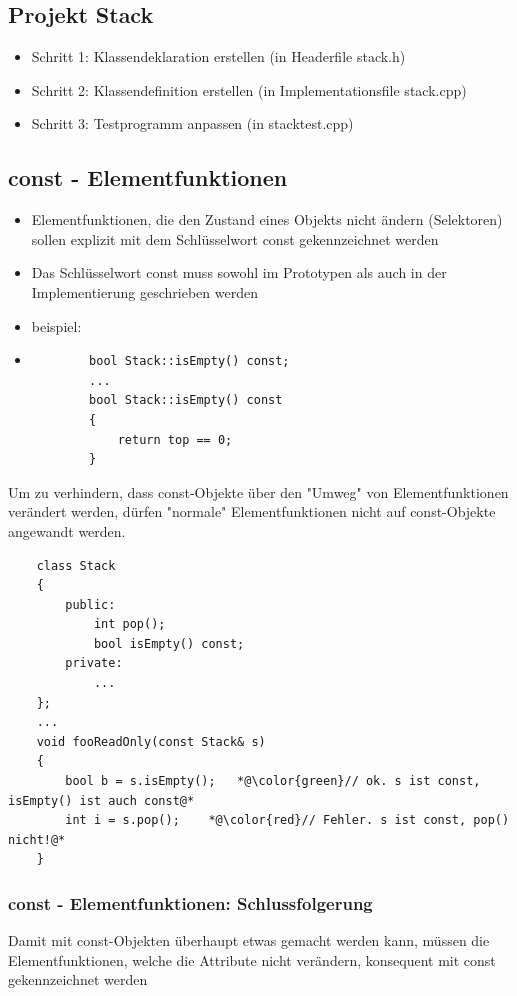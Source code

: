 \subsection{Projekt Stack}
\label{sec:Projekt Stack}
\begin{itemize}
	\item Schritt 1: Klassendeklaration erstellen (in Headerfile stack.h)
	\item Schritt 2: Klassendefinition erstellen (in Implementationsfile stack.cpp)
	\item Schritt 3: Testprogramm anpassen (in stacktest.cpp)
\end{itemize}

\subsection{const - Elementfunktionen}
\label{sec:const - Elementfunktionen}
\begin{itemize}
	\item Elementfunktionen, die den Zustand eines Objekts nicht ändern (Selektoren) sollen explizit mit dem Schlüsselwort const gekennzeichnet werden
	\item Das Schlüsselwort const muss sowohl im Prototypen als auch in der Implementierung geschrieben werden
	\item beispiel:
	\item[\-] \begin{minipage}{\linewidth}
		\begin{lstlisting}
		bool Stack::isEmpty() const;
		...
		bool Stack::isEmpty() const
		{
			return top == 0;
		}
		\end{lstlisting}
	\end{minipage}
\end{itemize}
Um zu verhindern, dass const-Objekte über den "Umweg" von Elementfunktionen verändert werden, dürfen "normale" Elementfunktionen nicht auf const-Objekte angewandt werden.
\noindent
\begin{minipage}{\linewidth}
	\begin{lstlisting}
	class Stack
	{
		public:
			int pop();
			bool isEmpty() const;
		private:
			...
	};
	...
	void fooReadOnly(const Stack& s)
	{
		bool b = s.isEmpty();	*@\color{green}// ok. s ist const, isEmpty() ist auch const@*
		int i = s.pop();	*@\color{red}// Fehler. s ist const, pop() nicht!@*
	}
	\end{lstlisting}
\end{minipage}

\subsubsection{const - Elementfunktionen: Schlussfolgerung}
\label{sec:const - Elementfunktionen: Schlussfolgerung}
Damit mit const-Objekten überhaupt etwas gemacht werden kann, müssen die Elementfunktionen, welche die Attribute nicht verändern, konsequent mit const gekennzeichnet werden

